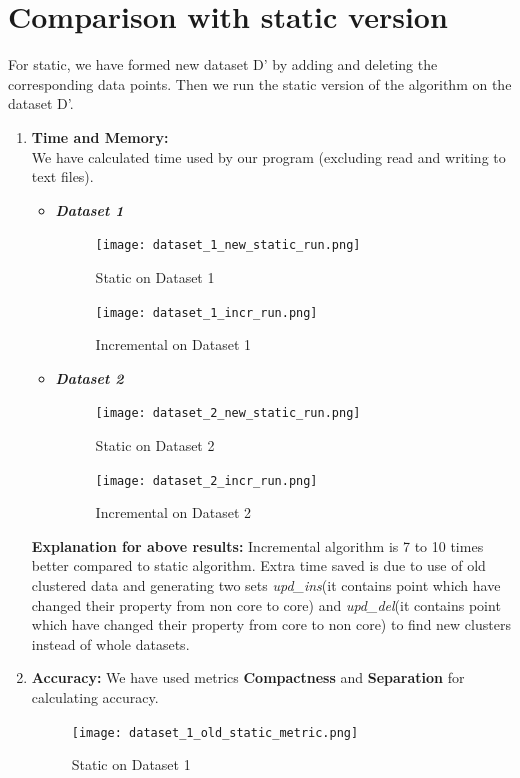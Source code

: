 \documentclass[acmsmall]{acmart}
\begin{document}
\section*{Comparison with static version}
For static, we have formed new dataset D' by adding and deleting the corresponding data points. Then we run the static version of the algorithm on the dataset D'.
\begin{enumerate}
    \item \textbf{Time and Memory: }\\
        We have calculated time used by our program (excluding read and writing to text files). \\
        \begin{itemize}
            \item \textit{\textbf{Dataset 1}} 
                \begin{figure} [H]
                    \texttt{[image: dataset\_1\_new\_static\_run.png]}
                    \caption{Static on Dataset 1} 
                \end{figure}
                    
                \begin{figure} [H]
                    \texttt{[image: dataset\_1\_incr\_run.png]}
                    \caption{Incremental on Dataset 1} 
                \end{figure}
                
            \item \textit{\textbf{Dataset 2}}
                \begin{figure} [H]
                    \texttt{[image: dataset\_2\_new\_static\_run.png]}
                    \caption{Static on Dataset 2}
                \end{figure}
                    
                \begin{figure} [H]
                    \texttt{[image: dataset\_2\_incr\_run.png]}
                    \caption{Incremental on Dataset 2}
                \end{figure}
        \end{itemize}
        \textbf{Explanation for above results: } Incremental algorithm is 7 to 10 times better compared to static algorithm. Extra time saved is due to use of old clustered data and generating two sets \textit{upd\_ins}(it contains point which have changed their property from non core to core) and \textit{upd\_del}(it contains point which have changed their property from core to non core) to find new clusters instead of whole datasets.
        \vspace{2pt}
    \item \textbf{Accuracy: }
        We have used metrics \textbf{Compactness} and \textbf{Separation} for calculating accuracy.
        \begin{figure} [H]
            \texttt{[image: dataset\_1\_old\_static\_metric.png]}
            \caption{Static on Dataset 1} 
        \end{figure}
        

\end{enumerate}
\end{document}
